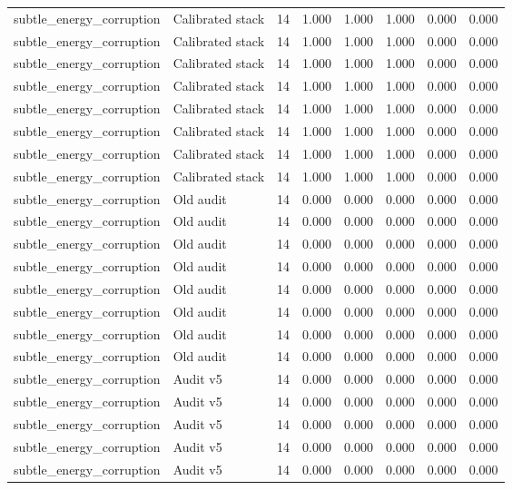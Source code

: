 {\begin{longtable}{llrrrrrr}
subtle\_energy\_corruption & Calibrated stack & 14 & 1.000 & 1.000 & 1.000 & 0.000 & 0.000 \\
subtle\_energy\_corruption & Calibrated stack & 14 & 1.000 & 1.000 & 1.000 & 0.000 & 0.000 \\
subtle\_energy\_corruption & Calibrated stack & 14 & 1.000 & 1.000 & 1.000 & 0.000 & 0.000 \\
subtle\_energy\_corruption & Calibrated stack & 14 & 1.000 & 1.000 & 1.000 & 0.000 & 0.000 \\
subtle\_energy\_corruption & Calibrated stack & 14 & 1.000 & 1.000 & 1.000 & 0.000 & 0.000 \\
subtle\_energy\_corruption & Calibrated stack & 14 & 1.000 & 1.000 & 1.000 & 0.000 & 0.000 \\
subtle\_energy\_corruption & Calibrated stack & 14 & 1.000 & 1.000 & 1.000 & 0.000 & 0.000 \\
subtle\_energy\_corruption & Calibrated stack & 14 & 1.000 & 1.000 & 1.000 & 0.000 & 0.000 \\
subtle\_energy\_corruption & Old audit & 14 & 0.000 & 0.000 & 0.000 & 0.000 & 0.000 \\
subtle\_energy\_corruption & Old audit & 14 & 0.000 & 0.000 & 0.000 & 0.000 & 0.000 \\
subtle\_energy\_corruption & Old audit & 14 & 0.000 & 0.000 & 0.000 & 0.000 & 0.000 \\
subtle\_energy\_corruption & Old audit & 14 & 0.000 & 0.000 & 0.000 & 0.000 & 0.000 \\
subtle\_energy\_corruption & Old audit & 14 & 0.000 & 0.000 & 0.000 & 0.000 & 0.000 \\
subtle\_energy\_corruption & Old audit & 14 & 0.000 & 0.000 & 0.000 & 0.000 & 0.000 \\
subtle\_energy\_corruption & Old audit & 14 & 0.000 & 0.000 & 0.000 & 0.000 & 0.000 \\
subtle\_energy\_corruption & Old audit & 14 & 0.000 & 0.000 & 0.000 & 0.000 & 0.000 \\
subtle\_energy\_corruption & Audit v5 & 14 & 0.000 & 0.000 & 0.000 & 0.000 & 0.000 \\
subtle\_energy\_corruption & Audit v5 & 14 & 0.000 & 0.000 & 0.000 & 0.000 & 0.000 \\
subtle\_energy\_corruption & Audit v5 & 14 & 0.000 & 0.000 & 0.000 & 0.000 & 0.000 \\
subtle\_energy\_corruption & Audit v5 & 14 & 0.000 & 0.000 & 0.000 & 0.000 & 0.000 \\
subtle\_energy\_corruption & Audit v5 & 14 & 0.000 & 0.000 & 0.000 & 0.000 & 0.000 \\

\end{longtable}}
